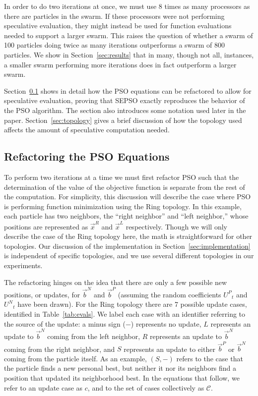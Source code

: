 \documentclass[smallcondensed]{svjour3}
\renewcommand{\sec}[1]{Section~\ref{sec:#1}}
\providecommand{\pers}{\ensuremath{P}}
\providecommand{\neigh}{\ensuremath{N}}
\providecommand{\leftind}{\ensuremath{L}}
\providecommand{\rightind}{\ensuremath{R}}
\providecommand{\nURand}{\ensuremath{U^\neigh}}
\providecommand{\pURand}{\ensuremath{U^\pers}}
\providecommand{\nbest}{\ensuremath{\Vec{b}^\neigh}}
\providecommand{\pbest}{\ensuremath{\Vec{b}^\pers}}
\providecommand{\leftn}{\ensuremath{\Vec{x}^\leftind}}
\providecommand{\rightn}{\ensuremath{\Vec{x}^\rightind}}
\providecommand{\caseset}{\ensuremath{\mathcal{C}}}
\providecommand{\casegen}{\ensuremath{c}}
\providecommand{\casexn}{\ensuremath{(S,-)}}
\begin{document}
In order to do two iterations at once, we must use 8 times as many processors
as there are particles in the swarm.  If these processors were not performing
speculative evaluation, they might instead be used for function evaluations
needed to support a larger swarm.  This raises the question of whether a swarm
of 100 particles doing twice as many iterations outperforms a swarm of 800
particles.  We show in \sec{results} that in many, though not all, instances, a
smaller swarm performing more iterations does in fact outperform a larger
swarm.

\sec{proof} shows in detail how the PSO equations can be refactored to allow
for speculative evaluation, proving that SEPSO exactly reproduces the behavior
of the PSO algorithm.  The section also introduces some notation used later in
the paper.  \sec{topology} gives a brief discussion of how the topology used
affects the amount of speculative computation needed.

\subsection{Refactoring the PSO Equations}
\label{sec:proof}

To perform two iterations at a time we must first refactor PSO such that the
determination of the value of the objective function is separate from the rest
of the computation.  For simplicity, this discussion will describe the case
where PSO is performing function minimization using the Ring topology.  In this
example, each particle has two neighbors, the ``right neighbor'' and ``left
neighbor,'' whose positions are represented as $\rightn$ and $\leftn$
respectively.  Though we will only describe the case of the Ring topology here,
the math is straightforward for other topologies.  Our discussion of the
implementation in \sec{implementation} is independent of specific topologies,
and we use several different topologies in our experiments.

The refactoring hinges on the idea that there are only a few possible new
positions, or updates, for $\nbest$ and $\pbest$ (assuming the random
coefficients $\pURand_{t}$ and $\nURand_{t}$ have been drawn).  For the Ring
topology there are 7 possible update cases, identified in
Table~\ref{tab:evals}.  We label each case with an identifier referring to the
source of the update: a minus sign ($-$) represents no update, $L$ represents
an update to $\nbest$ coming from the left neighbor, $R$ represents an update
to $\nbest$ coming from the right neighbor, and $S$ represents an update to
either $\pbest$ or $\nbest$ coming from the particle itself.  As an example,
$\casexn$ refers to the case that the particle finds a new personal best, but
neither it nor its neighbors find a position that updated its neighborhood
best.  In the equations that follow, we refer to an update case as $\casegen$,
and to the set of cases collectively as $\caseset$.
\end{document}
